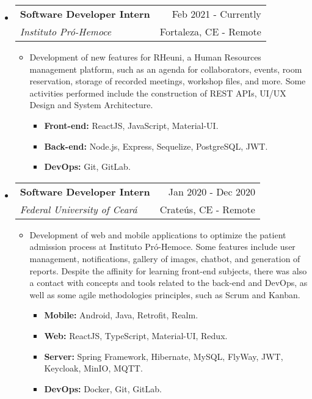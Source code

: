 \documentclass[letterpaper,11pt]{article}
\makeatletter
\newcommand{\resumeSubheading}[4]{
    \vspace{-1pt}\item
        \begin{tabular*}{0.97\textwidth}{l@{\extracolsep{\fill}}r}
            \textbf{#1} & #2 \\
            \textit{\small#3} & \small #4 \\
        \end{tabular*}
    \vspace{-5pt}
}
\newcommand{\resumeSubHeadingListStart}{\begin{itemize}[leftmargin=*]}
\newcommand{\resumeSubHeadingListEnd}{\end{itemize}}
\makeatother
\begin{document}
    \resumeSubHeadingListStart
        \resumeSubheading
        {Software Developer Intern}{\faCalendar \hspace{0.1cm} Feb 2021 - Currently}
        {Instituto Pró-Hemoce}{\faMapMarker \hspace{0.1cm} Fortaleza, CE - Remote}
        
        \begin{itemize}
            \item Development of new features for RHeuni, a Human Resources management platform, such as an agenda for collaborators, events, room reservation, storage of recorded meetings, workshop files, and more. Some activities performed include the construction of REST APIs, UI/UX Design and System Architecture.
            \begin{itemize}
                \item \textbf{Front-end:} ReactJS, JavaScript, Material-UI.
                \item \textbf{Back-end:} Node.js, Express, Sequelize, PostgreSQL, JWT.
                \item \textbf{DevOps:} Git, GitLab.
            \end{itemize}
        \end{itemize}
    \resumeSubHeadingListEnd
    
    \vspace{-0.3cm}

    \resumeSubHeadingListStart
        \resumeSubheading
        {Software Developer Intern}{\faCalendar \hspace{0.1cm} Jan 2020 - Dec 2020}
        {Federal University of Ceará}{\faMapMarker \hspace{0.1cm} Crateús, CE - Remote}
        
        \begin{itemize}
            \item Development of web and mobile applications to optimize the patient admission process at Instituto Pró-Hemoce. Some features include user management, notifications, gallery of images, chatbot, and generation of reports. Despite the affinity for learning front-end subjects, there was also a contact with concepts and tools related to the back-end and DevOps, as well as some agile methodologies principles, such as Scrum and Kanban.
            \begin{itemize}
                \item \textbf{Mobile:} Android, Java, Retrofit, Realm.
                \item \textbf{Web:} ReactJS, TypeScript, Material-UI, Redux.
                \item \textbf{Server:} Spring Framework, Hibernate, MySQL, FlyWay, JWT, Keycloak, MinIO, MQTT.
                \item \textbf{DevOps:} Docker, Git, GitLab.
            \end{itemize}
        \end{itemize}
        \vspace{0.02cm} %
    \resumeSubHeadingListEnd
\end{document}
